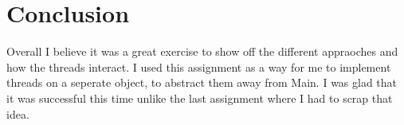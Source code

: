 \documentclass[12pt]{article}
\begin{document}
\section{Conclusion}
Overall I believe it was a great exercise to show off the different appraoches and how the threads interact. I used this
assignment as a way for me to implement threads on a seperate object, to abstract them away from Main. I was glad that it
was successful this time unlike the last assignment where I had to scrap that idea.
\end{document}
